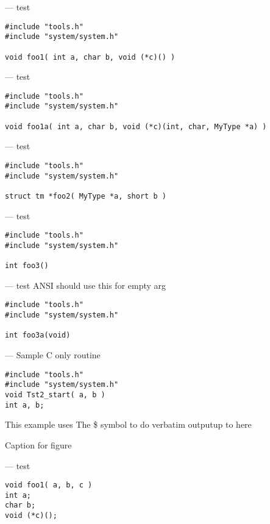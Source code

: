 \endmanpage
\startmanpage
{}
--- test  
\startvb\begin{verbatim}
#include "tools.h"
#include "system/system.h"

void foo1( int a, char b, void (*c)() )
\end{verbatim}
\endvb

\endmanpage
\startmanpage
{}
--- test  
\startvb\begin{verbatim}
#include "tools.h"
#include "system/system.h"

void foo1a( int a, char b, void (*c)(int, char, MyType *a) )
\end{verbatim}
\endvb

\endmanpage
\startmanpage
{}
--- test  
\startvb\begin{verbatim}
#include "tools.h"
#include "system/system.h"

struct tm *foo2( MyType *a, short b )
\end{verbatim}
\endvb

\endmanpage
\startmanpage
{}
--- test 
\startvb\begin{verbatim}
#include "tools.h"
#include "system/system.h"

int foo3()
\end{verbatim}
\endvb

\endmanpage
\startmanpage
{}
--- test ANSI should use this for empty arg 
\startvb\begin{verbatim}
#include "tools.h"
#include "system/system.h"

int foo3a(void)
\end{verbatim}
\endvb

\endmanpage
\startmanpage
{}
--- Sample C only routine 
\startvb\begin{verbatim}
#include "tools.h"
#include "system/system.h"
void Tst2_start( a, b )
int a, b;
\end{verbatim}
\endvb
This example uses
\linebreak   The \$ symbol to do verbatim output\linebreak   up to here
\par
\centerline{}\begin{center}\bf
\par
Caption for figure
\end{center}
\par
\par
\par
{}
\endmanpage
\startmanpage
{}
--- test  
\startvb\begin{verbatim}
void foo1( a, b, c )
int a;
char b;
void (*c)();
\end{verbatim}
\endvb

